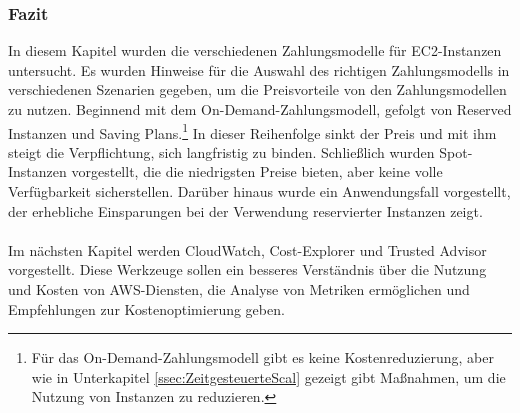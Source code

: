 \newpage
\subsubsection*{Fazit}%
In diesem Kapitel wurden die verschiedenen Zahlungsmodelle für EC2-Instanzen untersucht. Es wurden Hinweise für die Auswahl des richtigen Zahlungsmodells in verschiedenen Szenarien gegeben, um die Preisvorteile von den Zahlungsmodellen zu nutzen. Beginnend mit dem On-Demand-Zahlungsmodell, gefolgt von Reserved Instanzen und Saving Plans.\footnote{Für das On-Demand-Zahlungsmodell gibt es keine Kostenreduzierung, aber wie in Unterkapitel \ref{ssec:ZeitgesteuerteScal} gezeigt gibt Maßnahmen, um die Nutzung von Instanzen zu reduzieren.} In dieser Reihenfolge sinkt der Preis und mit ihm steigt die Verpflichtung, sich langfristig zu binden. Schließlich wurden Spot-Instanzen vorgestellt, die die niedrigsten Preise bieten, aber keine volle Verfügbarkeit sicherstellen. %
Darüber hinaus wurde ein Anwendungsfall vorgestellt, der erhebliche Einsparungen bei der Verwendung reservierter Instanzen zeigt.
\\\\
Im nächsten Kapitel werden CloudWatch, Cost-Explorer und Trusted Advisor vorgestellt. Diese Werkzeuge sollen ein besseres Verständnis über die Nutzung und Kosten von AWS-Diensten, die Analyse von Metriken ermöglichen und Empfehlungen zur Kostenoptimierung geben.
